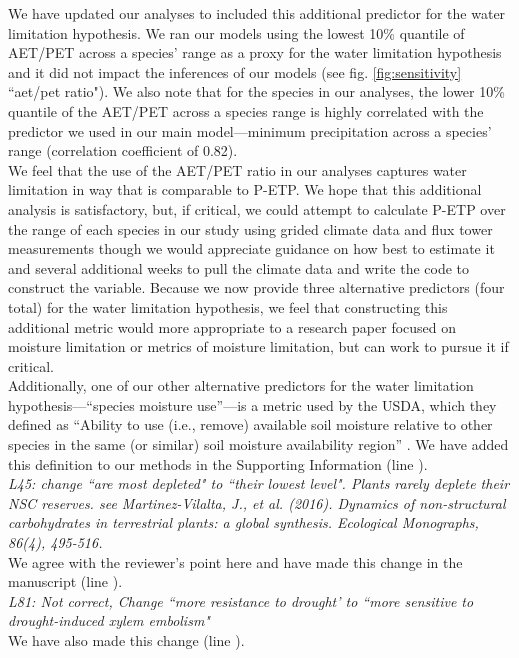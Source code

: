 \documentclass{article}[11pt]
\begin{document}
We have updated our analyses to included this additional predictor for the water limitation hypothesis. We ran our models using the lowest 10\% quantile of AET/PET across a species' range as a proxy for the water limitation hypothesis and it did not impact the inferences of our models (see fig. \ref{fig:sensitivity} ``aet/pet ratio"). We also note that for the species in our analyses, the lower 10\% quantile of the AET/PET across a species range is highly correlated with the predictor we used in our main model---minimum precipitation across a species' range (correlation coefficient of 0.82).\\ %

We feel that the use of the AET/PET ratio in our analyses captures water limitation in way that is comparable to P-ETP. We hope that this additional analysis is satisfactory, but, if critical, we could attempt to calculate P-ETP over the range of each species in our study using grided climate data and flux tower measurements though we would appreciate guidance on how best to estimate it and several additional weeks to pull the climate data and write the code to construct the variable. Because we now provide three alternative predictors  (four total) for the water limitation hypothesis, we feel that constructing this additional metric would more appropriate to a research paper focused on moisture limitation or metrics of moisture limitation, but can work to pursue it if critical.\\

Additionally, one of our other alternative predictors for the water limitation hypothesis---``species moisture use''---is a metric used by the USDA, which they defined as ``Ability to use (i.e., remove) available soil moisture relative to other species in the same (or similar) soil moisture availability region'' \citep{usdancrs}. We have added this definition to our methods in the Supporting Information (line ).\\ %

\textit{L45: change ``are most depleted" to ``their lowest level". Plants rarely deplete their NSC reserves. see Martinez-Vilalta, J., et al. (2016). Dynamics of non-structural carbohydrates in terrestrial plants: a global synthesis. Ecological Monographs, 86(4), 495-516.}\\

We agree with the reviewer's point here and have made this change in the manuscript (line ).\\


\textit{L81: Not correct, Change ``more resistance to drought' to ``more sensitive to drought-induced xylem embolism"}\\

We have also made this change (line ).


\end{document}

